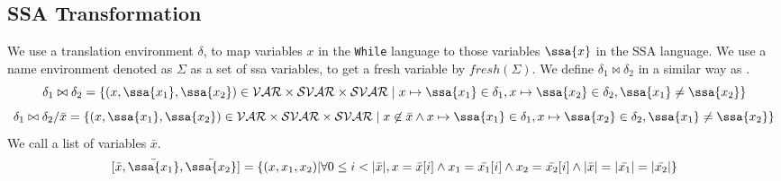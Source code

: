 %
\subsection{SSA Transformation}
We use a translation environment $\delta$, to map variables $x$ in the {\tt While} language to those variables $\ssa{x}$ in the SSA language.
We use a name environment denoted as $\Sigma$ as a set of ssa variables, to get a fresh variable by $fresh(\Sigma)$. 
We define $\delta_1 \bowtie \delta_2 $ in a similar way as
\cite{vekris2016refinement}.
%
\[ 
\delta_1 \bowtie \delta_2 = \{ ( x, {\ssa{x_1}, \ssa{x_2}} ) \in 
\mathcal{VAR} \times \mathcal{SVAR} \times \mathcal{SVAR} \mid x \mapsto {\ssa{x_1}} \in \delta_1 , x \mapsto {\ssa{x_2} } \in \delta_2, {\ssa{x_1} \not= {\ssa{x_2} }  }  \} 
\]
%
\[ 
\delta_1 \bowtie \delta_2 / \bar{x} = \{ ( x, {\ssa{x_1}, \ssa{x_2}} ) \in 
\mathcal{VAR} \times \mathcal{SVAR} \times \mathcal{SVAR}
 \mid x \not\in \bar{x} \land x \mapsto {\ssa{x_1}} \in \delta_1 , x \mapsto {\ssa{x_2} } \in \delta_2, {\ssa{x_1} \not= {\ssa{x_2} }   }  \} 
 \]
We call a list of variables $\bar{x}$.
\[
 [\bar{x}, \bar{\ssa{x_1}}, \bar{\ssa{x_2}}] = \{ (x, x_1,x_2)  | \forall 0 \leq i < |\bar{x}|, x = \bar{x }[i] \land x_1 = \bar{x_1}[i] \land x_2 = \bar{x_2 }[i] \land |\bar{x}| = |\bar{x_1}| = |\bar{x_2}|   \}
\]
%
